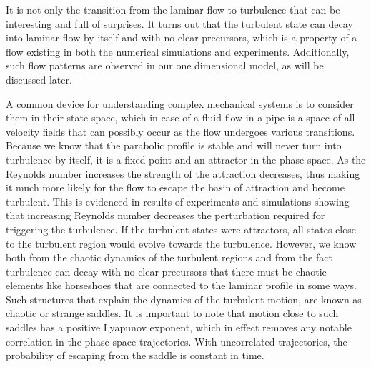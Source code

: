 \documentclass[11pt,a4paper]{article}
\begin{document}
It is not only the transition from the laminar flow to turbulence that can be interesting and full of surprises.
It turns out that the turbulent state can decay into laminar flow by itself and with no clear precursors, which is a property of a flow existing in both the numerical simulations\cite{Brosa89}\cite{Faisst04} and experiments\cite{Darbyshire95}\cite{Hof04}\cite{Mullin06}.
Additionally, such flow patterns are observed in our one dimensional model, as will be discussed later.

A common device for understanding complex mechanical systems is to consider them in their state space, which in case of a fluid flow in a pipe\cite{Lanford82} is a space of all velocity fields that can possibly occur as the flow undergoes various transitions.
Because we know that the parabolic profile is stable\cite{Eckhardt07} and will never turn into turbulence by itself, it is a fixed point and an attractor in the phase space.
As the Reynolds number increases the strength of the attraction decreases, thus making it much more likely for the flow to escape the basin of attraction and become turbulent.
This is evidenced in results of experiments and simulations\cite{Eckhardt07} showing that increasing Reynolds number decreases the perturbation required for triggering the turbulence.
If the turbulent states were attractors\cite{Guckenheimer86}\cite{Lanford82}, all states close to the turbulent region would evolve towards the turbulence.
However, we know both from the chaotic dynamics of the turbulent regions and from the fact turbulence can decay with no clear precursors that there must be chaotic elements\cite{Guckenheimer83} like horseshoes that are connected to the laminar profile in some ways.
Such structures that explain the dynamics of the turbulent motion, are known as chaotic or strange saddles.
It is important to note that motion close to such saddles has a positive Lyapunov exponent, which in effect removes any notable correlation in the phase space trajectories.
With uncorrelated trajectories, the probability of escaping from the saddle is constant in time.
\end{document}
